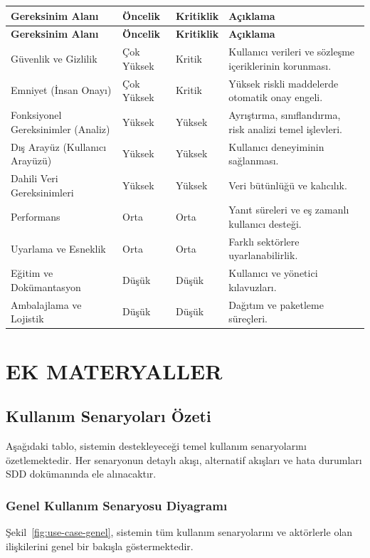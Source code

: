 \documentclass[12pt, a4paper]{article}
\begin{document}
\begin{longtable}{|p{5.5cm}|p{2.5cm}|p{2.5cm}|p{3cm}|}
\hline
\textbf{Gereksinim Alanı} & \textbf{Öncelik} & \textbf{Kritiklik} & \textbf{Açıklama} \\
\hline
\endfirsthead
\hline
\textbf{Gereksinim Alanı} & \textbf{Öncelik} & \textbf{Kritiklik} & \textbf{Açıklama} \\
\hline
\endhead
Güvenlik ve Gizlilik & Çok Yüksek & Kritik & Kullanıcı verileri ve sözleşme içeriklerinin korunması. \\
\hline
Emniyet (İnsan Onayı) & Çok Yüksek & Kritik & Yüksek riskli maddelerde otomatik onay engeli. \\
\hline
Fonksiyonel Gereksinimler (Analiz) & Yüksek & Yüksek & Ayrıştırma, sınıflandırma, risk analizi temel işlevleri. \\
\hline
Dış Arayüz (Kullanıcı Arayüzü) & Yüksek & Yüksek & Kullanıcı deneyiminin sağlanması. \\
\hline
Dahili Veri Gereksinimleri & Yüksek & Yüksek & Veri bütünlüğü ve kalıcılık. \\
\hline
Performans & Orta & Orta & Yanıt süreleri ve eş zamanlı kullanıcı desteği. \\
\hline
Uyarlama ve Esneklik & Orta & Orta & Farklı sektörlere uyarlanabilirlik. \\
\hline
Eğitim ve Dokümantasyon & Düşük & Düşük & Kullanıcı ve yönetici kılavuzları. \\
\hline
Ambalajlama ve Lojistik & Düşük & Düşük & Dağıtım ve paketleme süreçleri. \\
\hline
\end{longtable}

\newpage
\section{EK MATERYALLER}

\subsection{Kullanım Senaryoları Özeti}

Aşağıdaki tablo, sistemin destekleyeceği temel kullanım senaryolarını özetlemektedir. Her senaryonun detaylı akışı, alternatif akışları ve hata durumları SDD dokümanında ele alınacaktır.

\subsubsection{Genel Kullanım Senaryosu Diyagramı}
Şekil~\ref{fig:use-case-genel}, sistemin tüm kullanım senaryolarını ve aktörlerle olan ilişkilerini genel bir bakışla göstermektedir.
\end{document}
